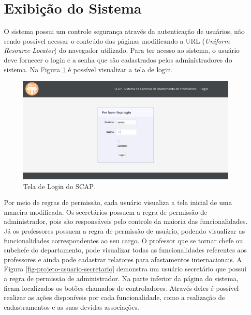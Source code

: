 \section{Exibição do Sistema}
\label{sec-projeto-exibicao-sistema}

O sistema possui um controle segurança através da autenticação de usuários, não sendo possível acessar o conteúdo das páginas modificando a URL (\textit{Uniform Resource Locator}) do navegador utilizado. Para ter acesso ao sistema, o usuário deve fornecer o login e a senha que são cadastrados pelos administradores do sistema. Na Figura \ref{fig-projeto-login} é possível visualizar a tela de login.   

\begin{figure}[h]
	\centering
	\includegraphics[scale=0.33]{figuras/fig-projeto-login} 
	\caption{Tela de Login do SCAP.}
	\label{fig-projeto-login}
\end{figure}

Por meio de regras de permissão, cada usuário visualiza a tela inicial de uma maneira modificada. Os secretários possuem a regra de permissão de administrador, pois são responsáveis pelo controle da maioria das funcionalidades. Já os professores possuem a regra de permissão de usuário, podendo visualizar as funcionalidades correspondentes ao seu cargo. O professor que se tornar chefe ou subchefe do departamento, pode visualizar todas as funcionalidades referentes aos professores e ainda pode cadastrar relatores para afastamentos internacionais. A Figura \ref{fig-projeto-usuario-secretario} demonstra um usuário secretário que possui a regra de permissão de administrador. Na parte inferior da página do sistema, ficam localizados os botões chamados de controladores. Através deles é possível realizar as ações disponíveis por cada funcionalidade, como a realização de cadastramentos e as suas devidas associações. 

